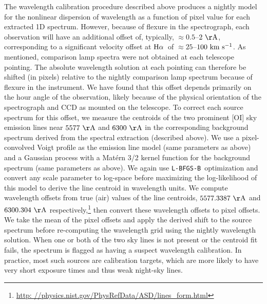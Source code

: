 \documentclass[modern, letterpaper]{aastex61}
\newcommand{\lbfgsb}{\texttt{L-BFGS-B}}
\newcommand{\Ha}{\ensuremath{{\rm H}\alpha}}
\begin{document}
The wavelength calibration procedure described above produces a nightly model
for the nonlinear dispersion of wavelength as a function of pixel value for
each extracted 1D spectrum.
However, because of flexure in the spectrograph, each observation will have an
additional offset of, typically, $\approx 0.5$--$2~{\rm \AA}$, corresponding to
a significant velocity offset at \Ha\ of $\approx 25$--$100~\mathrm{km}~\mathrm{s}^{-1}$.
As mentioned, comparison lamp spectra were not obtained at each telescope
pointing.
The absolute wavelength solution at each pointing can therefore be shifted
(in pixels) relative to the nightly comparison lamp spectrum because of flexure
in the instrument.
We have found that this offset depends primarily on the hour angle of the
observation, likely because of the physical orientation of the spectrograph and
CCD as mounted on the telescope.
To correct each source spectrum for this offset, we measure the centroids of
the two prominent [OI] sky emission lines near $5577~{\rm \AA}$ and $6300~{\rm
\AA}$ in the corresponding background spectrum derived from the spectral
extraction (described above).
We use a pixel-convolved Voigt profile as the emission line model (same
parameters as above) and a Gaussian process with a Mat\'ern 3/2 kernel function
for the background spectrum (same parameters as above).
We again use \lbfgsb\ optimization and convert any scale parameter to log-space
before maximizing the log-likelihood of this model to derive the line centroid
in wavelength units.
We compute wavelength offsets from true (air) values of the line centroids,
$5577.3387~{\rm \AA}$ and $6300.304~{\rm \AA}$ respectively,\footnote{\url{http:
//physics.nist.gov/PhysRefData/ASD/lines_form.html}} then convert these
wavelength offsets to pixel offsets.
We take the mean of the pixel offsets and apply the derived shift to the source
spectrum before re-computing the wavelength grid using the nightly wavelength
solution.
When one or both of the two sky lines is not present or the centroid fit fails,
the spectrum is flagged as having a suspect wavelength calibration.
In practice, most such sources are calibration targets, which are more likely to
have very short exposure times and thus weak night-sky lines.
\end{document}
